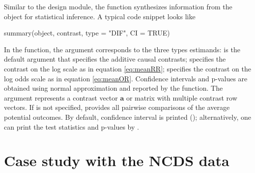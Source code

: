 Similar to the design module, the  function synthesizes information from the  object for statistical inference. A typical code snippet looks like

\begin{example}
summary(object, contrast, type = "DIF", CI = TRUE)
\end{example}

In the  function, the argument  corresponds to the three types estimands:  
is the default argument that specifies the additive causal contrasts;  specifies the contrast on the log scale as in equation \eqref{eq:meanRR};  specifies the contrast on the log odds scale as in equation \eqref{eq:meanOR}. Confidence intervals and p-values are obtained using normal approximation and reported by the  function. The argument  represents a contrast vector $\pmb{a}$ or matrix with multiple contrast row vectors. If  is not specified,  provides all pairwise comparisons of the average potential outcomes. By default, confidence interval is printed (); alternatively, one can print the test statistics and p-values by .

\section{Case study with the NCDS data} \label{sec:illustrations}

